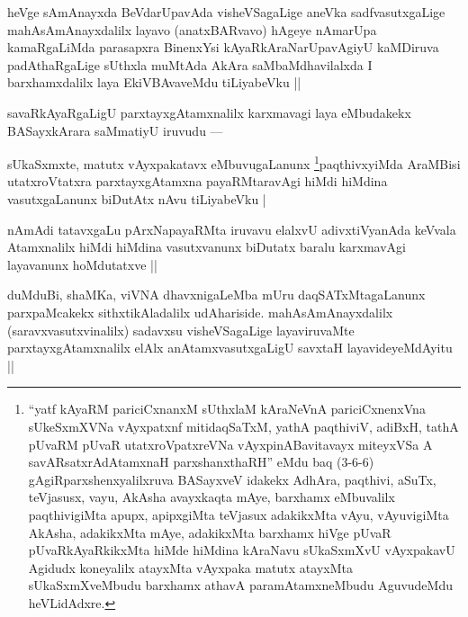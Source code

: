 
\begin{artha}
heVge sAmAnayxda BeVdarUpavAda visheVSagaLige aneVka sadfvasutxgaLige mahAsAmAnayxdalilx layavo (anatxBARvavo) hAgeye nAmarUpa kamaRgaLiMda parasapxra BinenxYsi kAyaRkAraNarUpavAgiyU kaMDiruva padAthaRgaLige sUthxla muMtAda AkAra saMbaMdhavilalxda I barxhamxdalilx laya EkiVBAvaveMdu tiLiyabeVku ||
\end{artha}

\begin{artha}
savaRkAyaRgaLigU parxtayxgAtamxnalilx karxmavagi laya eMbudakekx BASayxkArara saMmatiyU iruvudu ---
\end{artha}

\begin{artha}
sUkaSxmxte, matutx vAyxpakatavx eMbuvugaLanunx \footnote[1]{``yatf kAyaRM pariciCxnanxM sUthxlaM kAraNeVnA pariciCxnenxVna sUkeSxmXVNa vAyxpatxnf mitidaqSaTxM, yathA paqthiviV, adiBxH, tathA pUvaRM pUvaR utatxroVpatxreVNa vAyxpinABavitavayx miteyxVSa A savARsatxrAdAtamxnaH parxshanxthaRH'' eMdu baq (3-6-6) gAgiRparxshenxyalilxruva BASayxveV idakekx AdhAra, paqthivi, aSuTx, teVjasusx, vayu, AkAsha avayxkaqta mAye, barxhamx eMbuvalilx paqthivigiMta apupx, apipxgiMta teVjasux adakikxMta vAyu, vAyuvigiMta AkAsha, adakikxMta mAye, adakikxMta barxhamx hiVge pUvaR pUvaRkAyaRkikxMta hiMde hiMdina kAraNavu sUkaSxmXvU vAyxpakavU Agidudx koneyalilx atayxMta vAyxpaka matutx atayxMta sUkaSxmXveMbudu barxhamx athavA paramAtamxneMbudu AguvudeMdu heVLidAdxre.}paqthivxyiMda AraMBisi utatxroVtatxra parxtayxgAtamxna payaRMtaravAgi hiMdi hiMdina vasutxgaLanunx biDutAtx nAvu tiLiyabeVku |
\end{artha}


\begin{artha}
nAmAdi tatavxgaLu pArxNapayaRMta iruvavu elalxvU adivxtiVyanAda keVvala Atamxnalilx hiMdi hiMdina vasutxvanunx biDutatx baralu karxmavAgi layavanunx hoMdutatxve ||
\end{artha}

\begin{artha}
duMduBi, shaMKa, viVNA dhavxnigaLeMba mUru daqSATxMtagaLanunx parxpaMcakekx sithxtikAladalilx udAhariside. mahAsAmAnayxdalilx (saravxvasutxvinalilx) sadavxsu visheVSagaLige layaviruvaMte parxtayxgAtamxnalilx elAlx anAtamxvasutxgaLigU savxtaH layavideyeMdAyitu ||
\end{artha}


